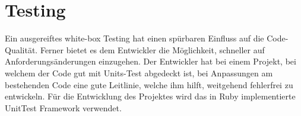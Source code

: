 \section{Testing}
Ein ausgereiftes white-box Testing hat einen spürbaren Einfluss auf die Code-Qualität. Ferner bietet es dem Entwickler die Möglichkeit, schneller auf Anforderungsänderungen einzugehen. Der Entwickler hat bei einem Projekt, bei welchem der Code gut mit Units-Test abgedeckt ist, bei Anpassungen am bestehenden Code eine gute Leitlinie, welche ihm hilft, weitgehend fehlerfrei zu entwickeln.
Für die Entwicklung des Projektes wird das in Ruby implementierte UnitTest Framework verwendet.

